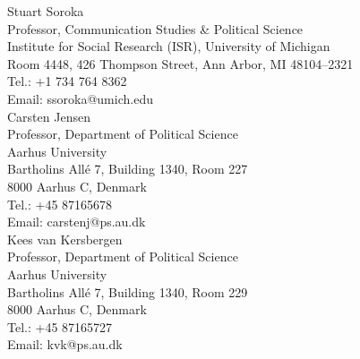 \documentclass[letterpaper]{scrartcl}
\begin{document}


	\vspace{-.5em}


	Stuart Soroka\\
	Professor, Communication Studies \& Political Science\\
	Institute for Social Research (ISR), University of Michigan\\
	Room 4448, 426 Thompson Street, Ann Arbor, MI 48104–2321\\
	Tel.: +1 734 764 8362\\
	Email: ssoroka@umich.edu\\

	Carsten Jensen\\
	Professor, Department of Political Science\\
	Aarhus University\\
	Bartholins Allé 7, Building 1340, Room 227\\
	8000 Aarhus C, Denmark\\
	Tel.: +45 87165678\\
	Email: carstenj@ps.au.dk\\

	Kees van Kersbergen\\
	Professor, Department of Political Science\\
	Aarhus University\\
	Bartholins Allé 7, Building 1340, Room 229\\
	8000 Aarhus C, Denmark\\
	Tel.: +45 87165727\\
	Email: kvk@ps.au.dk\\
\end{document}

